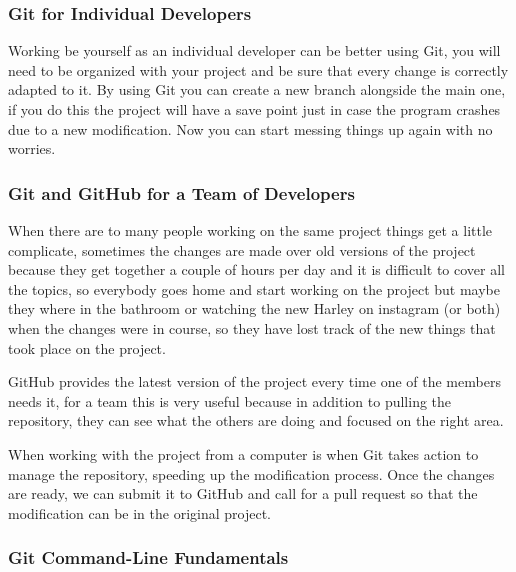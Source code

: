 \documentclass{article}
\begin{document}
    \subsubsection{Git for Individual Developers}
    
    Working be yourself as an individual developer can be better using Git, you will need to be organized with your project and be sure that every change is correctly adapted to it. By using Git you can create a new branch alongside the main one, if you do this the project will have a save point just in case the program crashes due to a new modification. Now you can start messing things up again with no worries.
    
    \subsubsection{Git and GitHub for a Team of Developers}
    
    When there are to many people working on the same project things get a little complicate, sometimes the changes are made over old versions of the project because they get together a couple of hours per day and it is difficult to cover all the topics, so everybody goes home and start working on the project but maybe they where in the bathroom or watching the new Harley on instagram (or both) when the changes were in course, so they have lost track of the new things that took place on the project.\par
    
    GitHub provides the latest version of the project every time one of the members needs it, for a team this is very useful because in addition to pulling the repository, they can see what the others are doing and focused on the right area.\par
    
    When working with the project from a computer is when Git takes action to manage the repository, speeding up the modification process. Once the changes are ready, we can submit it to GitHub and call for a pull request so that the modification can be in the original project.
    
    \subsubsection{Git Command-Line Fundamentals}
    
\end{document}

